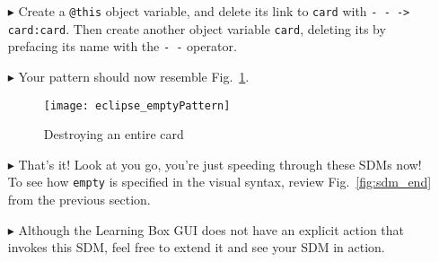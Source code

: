 \begin{itemize}
\item[$\blacktriangleright$] Create a \texttt{@this} object variable, and delete its link to \texttt{card} with \texttt{-~- -> card:card}. Then create another
object variable \texttt{card}, deleting its by prefacing its name with the \texttt{-~-} operator.

\vspace{0.5cm}

\item[$\blacktriangleright$] Your pattern should now resemble Fig.~\ref{fig:emptyPattern}.

\vspace{0.5cm}

\begin{figure}[htpb]
\begin{center}
  \texttt{[image: eclipse\_emptyPattern]}
  \caption{Destroying an entire card}
  \label{fig:emptyPattern}
\end{center}
\end{figure}

\item[$\blacktriangleright$] That's it! Look at you go, you're just speeding through these SDMs now! To see how \texttt{empty} is specified in the visual
syntax, review Fig.~\ref{fig:sdm_end} from the previous section.

\item[$\blacktriangleright$] Although the Learning Box GUI does not have an explicit action that invokes this SDM, feel free to extend it and see your SDM in
action.

\end{itemize}
